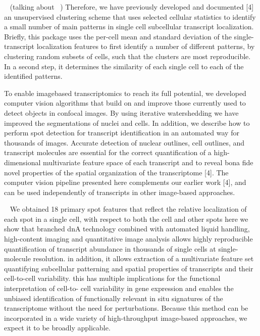 ~\cite{stoeger_computer_2015}
(talking about ~\cite{battich_image-based_2013})
Therefore, we have previously developed and documented [4] an unsupervised
clustering scheme that uses selected cellular statistics to identify a small
number of main patterns in single cell subcellular transcript localization.
Briefly, this package uses the per-cell mean and standard deviation of the
single-transcript localization features to first identify a number of
different patterns, by clustering random subsets of cells, such that
the clusters are most reproducible. In a second step, it determines the
similarity of each single cell to each of the identified patterns.

To enable imagebased transcriptomics to reach its full potential, we developed
computer vision algorithms that build on and improve those currently used to
detect objects in confocal images. By using iterative watershedding we have
improved the segmentations of nuclei and cells. In addition, we describe how
to perform spot detection for transcript identification in an automated way for
thousands of images. Accurate detection of nuclear outlines, cell outlines, and
transcript molecules are essential for the correct quantification of a
high-dimensional multivariate feature space of each transcript and to reveal
bona fide novel properties of the spatial organization of the transcriptome [4].
The computer vision pipeline presented here complements our earlier work [4],
and can be used independently of transcripts in other image-based approaches.

~\cite{battich_image-based_2013}
We obtained 18 primary spot features that reflect the
relative localization of each spot in a single cell, with respect to both the cell and other spots
here we show that branched dnA technology combined with automated liquid handling, high-content imaging and quantitative image analysis allows highly reproducible quantification of transcript abundance in thousands of single cells at single-molecule resolution.
in addition, it allows extraction of a multivariate feature set quantifying subcellular patterning and spatial properties of transcripts and their cell-to-cell variability. this has multiple implications for the functional interpretation of cell-to-
cell variability in gene expression and enables the unbiased identification of functionally relevant in situ signatures
of the transcriptome without the need for perturbations. Because this method can be incorporated in a wide variety of high-throughput image-based approaches, we expect it to be broadly applicable.

